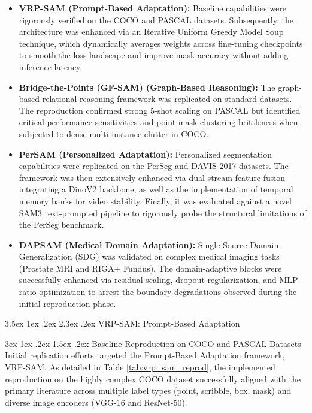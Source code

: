 \documentclass[journal,12pt,onecolumn,draftclsnofoot]{IEEEtran}
\makeatletter
\renewcommand{\section}{\@startsection{section}{1}{\z@}%
    {3.5ex \@plus 1ex \@minus .2ex}%
    {2.3ex \@plus.2ex}%
    {\normalfont\Large\bfseries}}
\renewcommand{\subsection}{\@startsection{subsection}{2}{\z@}%
    {3ex \@plus 1ex \@minus .2ex}%
    {1.5ex \@plus.2ex}%
    {\normalfont\large\bfseries}}
\makeatother
\begin{document}
\begin{itemize}
    \item \textbf{VRP-SAM (Prompt-Based Adaptation):} Baseline capabilities were rigorously verified on the COCO and PASCAL datasets. Subsequently, the architecture was enhanced via an Iterative Uniform Greedy Model Soup technique, which dynamically averages weights across fine-tuning checkpoints to smooth the loss landscape and improve mask accuracy without adding inference latency.
    \item \textbf{ Bridge-the-Points (GF-SAM) (Graph-Based Reasoning):} The graph-based relational reasoning framework was replicated on standard datasets. The reproduction confirmed strong 5-shot scaling on PASCAL but identified critical performance sensitivities and point-mask clustering brittleness when subjected to dense multi-instance clutter in COCO.
    \item \textbf{PerSAM (Personalized Adaptation):} Personalized segmentation capabilities were replicated on the PerSeg and DAVIS 2017 datasets. The framework was then extensively enhanced via dual-stream feature fusion integrating a DinoV2 backbone, as well as the implementation of temporal memory banks for video stability. Finally, it was evaluated against a novel SAM3 \cite{carion2025sam3} text-prompted pipeline to rigorously probe the structural limitations of the PerSeg benchmark.
    \item \textbf{DAPSAM (Medical Domain Adaptation):} Single-Source Domain Generalization (SDG) was validated on complex medical imaging tasks (Prostate MRI and RIGA+ Fundus). The domain-adaptive blocks were successfully enhanced via residual scaling, dropout regularization, and MLP ratio optimization to arrest the boundary degradations observed during the initial reproduction phase.
\end{itemize}


\newpage


\section{VRP-SAM: Prompt-Based Adaptation \cite{sun2024vrp}}

\subsection{Baseline Reproduction on COCO and PASCAL Datasets}
Initial replication efforts targeted the Prompt-Based Adaptation framework, VRP-SAM. As detailed in Table \ref{tab:vrp_sam_reprod}, the implemented reproduction on the highly complex COCO dataset successfully aligned with the primary literature across multiple label types (point, scribble, box, mask) and diverse image encoders (VGG-16 and ResNet-50).
\end{document}
